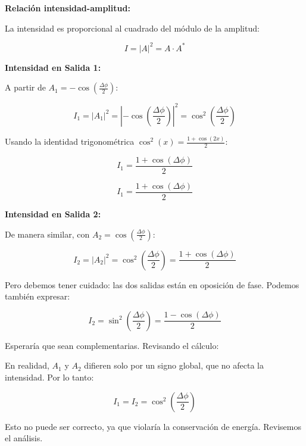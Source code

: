 \documentclass[12pt,a4paper]{article}
\begin{document}
\textbf{Relación intensidad-amplitud:}

La intensidad es proporcional al cuadrado del módulo de la amplitud:

\begin{equation}
    I = |A|^2 = A \cdot A^*
\end{equation}

\textbf{Intensidad en Salida 1:}

A partir de $A_1 = -\cos\left(\frac{\Delta\phi}{2}\right)$:

\begin{equation}
    I_1 = |A_1|^2 = \left|-\cos\left(\frac{\Delta\phi}{2}\right)\right|^2 = \cos^2\left(\frac{\Delta\phi}{2}\right)
\end{equation}

Usando la identidad trigonométrica $\cos^2(x) = \frac{1 + \cos(2x)}{2}$:

\begin{equation}
    I_1 = \frac{1 + \cos(\Delta\phi)}{2}
\end{equation}

\begin{equation}
    \boxed{I_1 = \frac{1 + \cos(\Delta\phi)}{2}}
\end{equation}

\textbf{Intensidad en Salida 2:}

De manera similar, con $A_2 = \cos\left(\frac{\Delta\phi}{2}\right)$:

\begin{equation}
    I_2 = |A_2|^2 = \cos^2\left(\frac{\Delta\phi}{2}\right) = \frac{1 + \cos(\Delta\phi)}{2}
\end{equation}

Pero debemos tener cuidado: las dos salidas están en oposición de fase. Podemos también expresar:

\begin{equation}
    I_2 = \sin^2\left(\frac{\Delta\phi}{2}\right) = \frac{1 - \cos(\Delta\phi)}{2}
\end{equation}

Esperaría que sean complementarias. Revisando el cálculo:

En realidad, $A_1$ y $A_2$ difieren solo por un signo global, que no afecta la intensidad. Por lo tanto:

\begin{equation}
    I_1 = I_2 = \cos^2\left(\frac{\Delta\phi}{2}\right)
\end{equation}

Esto no puede ser correcto, ya que violaría la conservación de energía. Revisemos el análisis.
\end{document}
